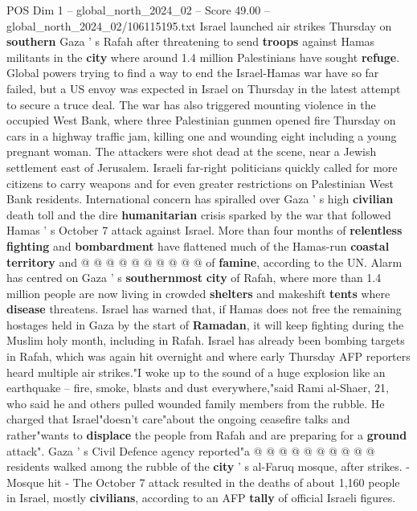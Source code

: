 \begin{textsample}{POS Dim 1 – global\_north\_2024\_02 – Score 49.00 – global\_north\_2024\_02/106115195.txt}  \label{ex:f1_pos_092}
Israel launched air strikes Thursday on \textbf{southern} Gaza ' s Rafah after threatening to send \textbf{troops} against Hamas militants in the \textbf{city} where around 1.4 million Palestinians have sought \textbf{refuge}.
Global powers trying to find a way to end the Israel-Hamas war have so far failed, but a US envoy was expected in Israel on Thursday in the latest attempt to secure a truce deal.
The war has also triggered mounting violence in the occupied West Bank, where three Palestinian gunmen opened fire Thursday on cars in a highway traffic jam, killing one and wounding eight including a young pregnant woman.
The attackers were shot dead at the scene, near a Jewish settlement east of Jerusalem.
Israeli far-right politicians quickly called for more citizens to carry weapons and for even greater restrictions on Palestinian West Bank residents.
International concern has spiralled over Gaza ' s high \textbf{civilian} death toll and the dire \textbf{humanitarian} crisis sparked by the war that followed Hamas ' s October 7 attack against Israel.
More than four months of \textbf{relentless} \textbf{fighting} and \textbf{bombardment} have flattened much of the Hamas-run \textbf{coastal} \textbf{territory} and @ @ @ @ @ @ @ @ @ @ of \textbf{famine}, according to the UN.
Alarm has centred on Gaza ' s \textbf{southernmost} \textbf{city} of Rafah, where more than 1.4 million people are now living in crowded \textbf{shelters} and makeshift \textbf{tents} where \textbf{disease} threatens.
Israel has warned that, if Hamas does not free the remaining hostages held in Gaza by the start of \textbf{Ramadan}, it will keep fighting during the Muslim holy month, including in Rafah.
Israel has already been bombing targets in Rafah, which was again hit overnight and where early Thursday AFP reporters heard multiple air strikes."I woke up to the sound of a huge explosion like an earthquake -- fire, smoke, blasts and dust everywhere,"said Rami al-Shaer, 21, who said he and others pulled wounded family members from the rubble.
He charged that Israel"doesn't care"about the ongoing ceasefire talks and rather"wants to \textbf{displace} the people from Rafah and are preparing for a \textbf{ground} attack".
Gaza ' s Civil Defence agency reported"a @ @ @ @ @ @ @ @ @ @ residents walked among the rubble of the \textbf{city} ' s al-Faruq mosque, after strikes. - Mosque hit - The October 7 attack resulted in the deaths of about 1,160 people in Israel, mostly \textbf{civilians}, according to an AFP \textbf{tally} of official Israeli figures.

\end{textsample}
